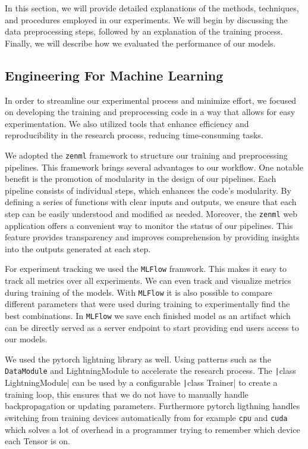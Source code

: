 
In this section, we will provide detailed explanations of the methods, techniques, and procedures employed in our experiments. We will begin by discussing the data preprocessing steps, followed by an explanation of the training process. Finally, we will describe how we evaluated the performance of our models.

\subsection{Engineering For Machine Learning}
In order to streamline our experimental process and minimize effort, we focused on developing the training and preprocessing code in a way that allows for easy experimentation. We also utilized tools that enhance efficiency and reproducibility in the research process, reducing time-consuming tasks.
\medskip

We adopted the \texttt{zenml} framework to structure our training and preprocessing pipelines. This framework brings several advantages to our workflow.
One notable benefit is the promotion of modularity in the design of our pipelines. Each pipeline consists of individual steps, which enhances the code's modularity. By defining a series of functions with clear inputs and outputs, we ensure that each step can be easily understood and modified as needed. Moreover, the \texttt{zenml} web application offers a convenient way to monitor the status of our pipelines. This feature provides transparency and improves comprehension by providing insights into the outputs generated at each step.
\medskip

For experiment tracking we used the \texttt{MLFlow} framwork.
This makes it easy to track all metrics over all experiments.
We can even track and visualize metrics during training of the models.
With \texttt{MLFlow} it is also possible to compare different parameters that were used during training to experimentally find the best combinations.
In \texttt{MLFlow} we save each finished model as an artifact which can be directly served as a server endpoint to start providing end users access to our models.
\medskip

We used the pytorch lightning library as well. Using patterns such as the \texttt{DataModule} and {LightningModule} to accelerate the
research process. The \texttt|class LightningModule| can be used by a configurable \texttt|class Trainer| to create a training loop, this ensures that we do not have 
to manually handle backpropagation or updating parameters. Furthermore pytorch ligthning handles
switching from training devices automatically from for example \texttt{cpu} and \texttt{cuda} which solves a lot of overhead in a programmer trying to remember which device each Tensor is on.

